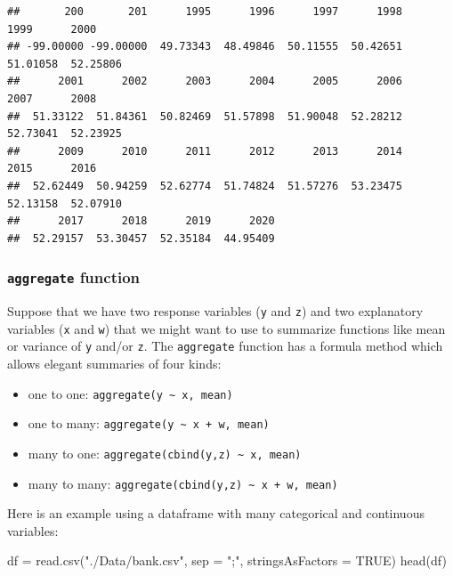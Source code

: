 \documentclass[
]{book}
\newenvironment{Shaded}{\begin{snugshade}}{\end{snugshade}}
\newcommand{\AttributeTok}[1]{\textcolor[rgb]{0.77,0.63,0.00}{#1}}
\newcommand{\ConstantTok}[1]{\textcolor[rgb]{0.00,0.00,0.00}{#1}}
\newcommand{\FunctionTok}[1]{\textcolor[rgb]{0.00,0.00,0.00}{#1}}
\newcommand{\NormalTok}[1]{#1}
\newcommand{\OtherTok}[1]{\textcolor[rgb]{0.56,0.35,0.01}{#1}}
\newcommand{\StringTok}[1]{\textcolor[rgb]{0.31,0.60,0.02}{#1}}
\providecommand{\tightlist}{%
  \setlength{\itemsep}{0pt}\setlength{\parskip}{0pt}}
\begin{document}
\begin{verbatim}
##       200       201      1995      1996      1997      1998      1999      2000 
## -99.00000 -99.00000  49.73343  48.49846  50.11555  50.42651  51.01058  52.25806 
##      2001      2002      2003      2004      2005      2006      2007      2008 
##  51.33122  51.84361  50.82469  51.57898  51.90048  52.28212  52.73041  52.23925 
##      2009      2010      2011      2012      2013      2014      2015      2016 
##  52.62449  50.94259  52.62774  51.74824  51.57276  53.23475  52.13158  52.07910 
##      2017      2018      2019      2020 
##  52.29157  53.30457  52.35184  44.95409
\end{verbatim}

\hypertarget{aggregate-function}{%
\subsubsection{\texorpdfstring{\texttt{aggregate} function}{aggregate function}}\label{aggregate-function}}

Suppose that we have two response variables (\texttt{y} and \texttt{z}) and two explanatory variables (\texttt{x} and \texttt{w}) that we might want to use to summarize functions like mean or variance of \texttt{y} and/or \texttt{z}. The \texttt{aggregate} function has a formula method which allows elegant summaries of four kinds:

\begin{itemize}
\tightlist
\item
  one to one: \texttt{aggregate(y\ \textasciitilde{}\ x,\ mean)}
\item
  one to many: \texttt{aggregate(y\ \textasciitilde{}\ x\ +\ w,\ mean)}
\item
  many to one: \texttt{aggregate(cbind(y,z)\ \textasciitilde{}\ x,\ mean)}
\item
  many to many: \texttt{aggregate(cbind(y,z)\ \textasciitilde{}\ x\ +\ w,\ mean)}
\end{itemize}

Here is an example using a dataframe with many categorical and continuous variables:

\begin{Shaded}
\begin{Highlighting}[]
\NormalTok{df }\OtherTok{=} \FunctionTok{read.csv}\NormalTok{(}\StringTok{"./Data/bank.csv"}\NormalTok{, }\AttributeTok{sep =} \StringTok{";"}\NormalTok{, }\AttributeTok{stringsAsFactors =} \ConstantTok{TRUE}\NormalTok{)}
\FunctionTok{head}\NormalTok{(df)}
\end{Highlighting}
\end{Shaded}
\end{document}

